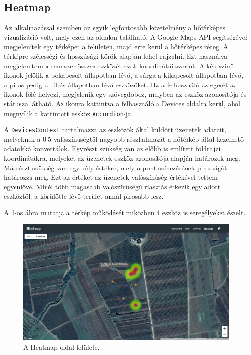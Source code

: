 \subsection{Heatmap}
Az alkalmazással szemben az egyik legfontosabb követelmény a hőtérképes vizualizáció volt,
mely ezen az oldalon található. A Google Maps API segítségével megjelenítek egy térképet a felületen,
majd erre kerül a hőtérképes réteg. A térképre szélességi és hosszúsági körök alapján lehet rajzolni.
Ezt használva megjelenítem a rendszer összes eszközét azok koordinátái szerint.
A kék színű ikonok jelölik a bekapcsolt állapotban lévő, a sárga a kikapcsolt állapotban lévő,
a piros pedig a hibás állapotban lévő eszközöket.
Ha a felhasználó az egerét az ikonok fölé helyezi, megjelenik egy szövegdoboz, melyben az eszköz azonosítója és státusza látható. 
Az ikonra kattintva a felhasználó a Devices oldalra kerül, ahol megnyílik a kattintott eszköz \verb+Accordion+-ja.

A \verb+DevicesContext+ tartalmazza az eszközök által küldött üzenetek adatait,
melyeknek a 0.5 valószínűségtől nagyobb részhalmazát a hőtérkép által kezelhető adatokká konvertálok.
Egyrészt szükség van az előbb is említett földrajzi koordinátákra, melyeket az üzenetek eszköz azonosítója alapján határozok meg.
Másrészt szükség van egy súly értékre, mely a pont színezésének pirosságát határozza meg.
Ezt az értéket az üzenetek valószínűség értékével tettem egyenlővé.
Minél több magasabb valószínűségű riasztás érkezik egy adott eszköztől, a körülötte lévő terület annál pirosabb lesz.

A \ref{fig:frontend-heatmap}-ös ábra mutatja a térkép működését miközben 4 eszköz is seregélyeket észelt.

\begin{figure}[!ht]
    \centering
    \includegraphics[width=150mm, keepaspectratio]{figures/heatmap.png}
    \caption{A Heatmap oldal felülete.}
    \label{fig:frontend-heatmap}
\end{figure}
